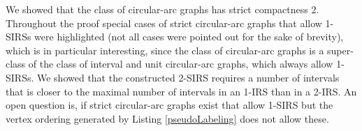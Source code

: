 \documentclass[10pt]{article}
\begin{document}
We showed that the class of circular-arc graphs has strict compactness 2.
Throughout the proof special cases of strict circular-arc graphs that allow 
1-SIRSs were highlighted (not all cases were pointed out for the sake of brevity), which is in particular interesting, since the class of circular-arc graphs is a super-class of the class of interval and unit circular-arc graphs, which always allow 1-SIRSs.
We showed
that the constructed 2-SIRS requires a number of intervals that is 
closer to the maximal number of intervals in an 1-IRS than in a 2-IRS. 
An open question is, if strict circular-arc graphs exist that allow 1-SIRS but the vertex ordering generated by
Listing \ref{pseudoLabeling} does not allow these.













































\end{document}
